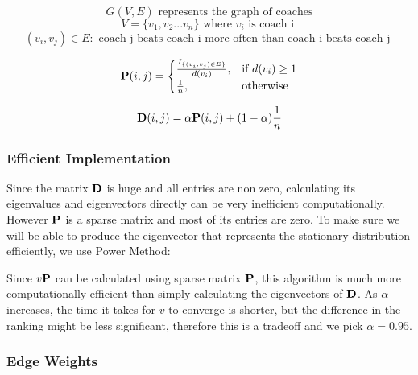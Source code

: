 \documentclass[titlepage,11pt]{article}
\begin{document}
$$G(V, E) \mbox{ represents the graph of coaches}$$
$$V = \{v_1, v_2 ... v_n\} \mbox{ where } v_i \mbox{ is coach i }$$
$$(v_i, v_j) \in E : \mbox{ coach j beats coach i more often than coach i beats coach j }$$



\[
    {\bf P} (i, j)= 
\begin{cases}
    \frac{ I_{\{(v_i, v_j) \in E\}}}{d(v_i)},& \text{if } d(v_i) \geq 1\\
    \frac{1}{n},              & \text{otherwise}
\end{cases}
\]

$${\bf D} (i, j) = \alpha {\bf P} (i, j)  + (1-\alpha)\frac{1}{n}$$


\subsubsection*{Efficient Implementation}


Since the matrix ${\bf D}$ is huge and all entries are non zero, calculating its eigenvalues and eigenvectors directly can be very inefficient computationally. However ${\bf P}$ is a sparse matrix and most of its entries are zero. To make sure we will be able to produce the eigenvector that represents the stationary distribution efficiently, we use Power Method:

\vspace{5mm}

\begin{algorithm}[H]
\begin{algorithmic}
\EndWhile
{}
\end{algorithmic}
\end{algorithm}

\vspace{5mm}

\noindent Since $v {\bf P}$ can be calculated using sparse matrix ${\bf P}$, this algorithm is much more computationally efficient than simply calculating the eigenvectors of ${\bf D}$. As $\alpha$ increases, the time it takes for $v$ to converge is shorter, but the difference in the ranking might be less significant, therefore this is a tradeoff and we pick $\alpha = 0.95$.

\subsubsection*{Edge Weights}
\end{document}

